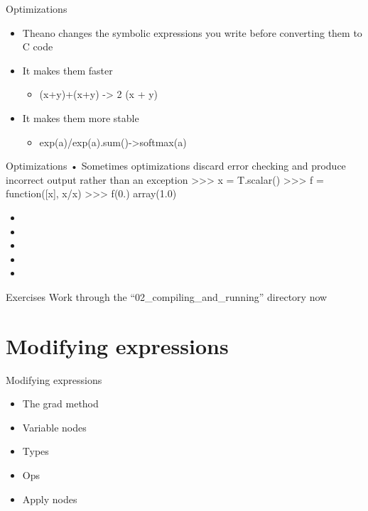 \documentclass[utf8x,xcolor=pdftex,dvipsnames,table]{beamer}
\begin{document}
\begin{frame}{Optimizations}
  \begin{itemize}
  \item Theano changes the symbolic expressions
    you write before converting them to C code
  \item It makes them faster
  \begin{itemize}
  \item (x+y)+(x+y) -> 2 (x + y)
  \end{itemize}
  \item It makes them more stable
  \begin{itemize}
  \item exp(a)/exp(a).sum()->softmax(a)
  \end{itemize}
  \end{itemize}
\end{frame}

\begin{frame}{Optimizations}
• Sometimes optimizations discard error
checking and produce incorrect output
rather than an exception
>>> x = T.scalar()
>>> f = function([x], x/x)
>>> f(0.)
array(1.0)


  \begin{itemize}
  \item
  \item
  \item
  \item
  \item
  \end{itemize}
\end{frame}

\begin{frame}{Exercises}
Work through the ``02\_compiling\_and\_running'' directory now
\end{frame}

\section{Modifying expressions}
\begin{frame}{Modifying expressions}
  \begin{itemize}
  \item The grad method
  \item Variable nodes
  \item Types
  \item Ops
  \item Apply nodes
  \end{itemize}
\end{frame}
\end{document}
